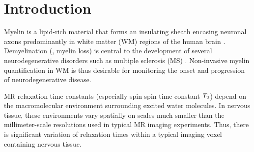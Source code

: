 
\section{Introduction}
\label{s,mwf,intro}

Myelin is a lipid-rich material
that forms an insulating sheath
encasing neuronal axons 
predominantly in white matter (WM) regions
of the human brain
\cite{morell:84}.
Demyelination (\ie, myelin loss) is central
to the development 
of several neurodegenerative disorders
such as multiple sclerosis (MS)
\cite{goldenberg:12:msr}. 
Non-invasive myelin quantification in WM
is thus desirable 
for monitoring the onset and progression
of neurodegenerative disease.

MR relaxation time constants
(especially spin-spin time constant $T_2$)
depend on the macromolecular environment
surrounding excited water molecules.
In nervous tissue,
these environments vary spatially
on scales much smaller 
than the millimeter-scale resolutions
used in typical MR imaging experiments.
Thus, 
there is significant variation
of relaxation times 
within a typical imaging voxel 
containing nervous tissue.

